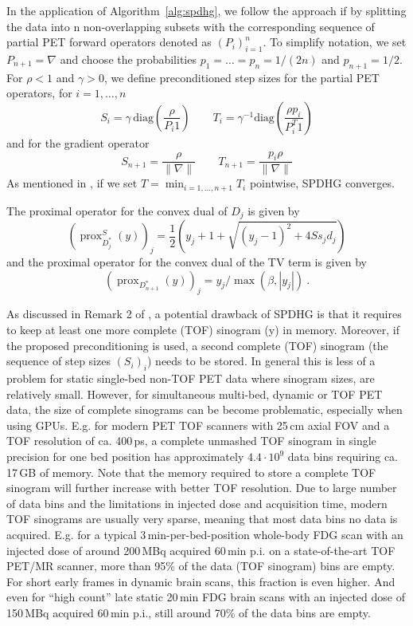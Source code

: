 \documentclass[11pt,twocolumn,twoside]{article}
\DeclareMathOperator{\prox}{prox}
\begin{document}
In the application of Algorithm~\ref{alg:spdhg}, we follow the approach if \cite{Ehrhardt2019}
by splitting the data into n non-overlapping subsets with the corresponding 
sequence of partial PET forward operators denoted as $(P_i)_{i=1}^n$.
To simplify notation, we set $P_{n+1} = \nabla$ and choose the probabilities $p_1=\ldots=p_n = 1/(2n)$
and $p_{n+1} = 1/2$.
For $\rho<1$ and $\gamma>0$, we define preconditioned step sizes for the partial PET operators, 
for $i=1,\ldots,n$
\[ S_i = \gamma \, \text{diag}(\frac{\rho}{P_i 1} )\qquad  T_i = \gamma^{-1} \text{diag}(\frac{\rho p_i}{P^T_i 1}) \]
and for the gradient operator
\[ S_{n+1} = \frac{\rho}{\|\nabla\|} \qquad T_{n+1} = \frac{p_i\rho}{\|\nabla\|} \]  
As mentioned in \cite{Ehrhardt2019}, if we set $T = \min_{i=1,\ldots,n+1} T_i$ pointwise,
SPDHG converges.

The proximal operator for the convex dual of $D_j$ is given by
\begin{equation}
(\prox_{D_j^*}^{S}(y))_j = \frac{1}{2} \left(y_j + 1 + \sqrt{ (y_j-1)^2 + 4 S s_j d_j} \right)
\label{eq:proxD}
\end{equation} 
and the proximal operator for the convex dual of the TV term is given by
\begin{equation}
(\prox_{D_{n+1}^*}(y) )_j = y_j /\max(\beta,|y_j|) \ .
\end{equation}

As discussed in Remark 2 of \cite{Ehrhardt2019}, a potential drawback of SPDHG is that it requires
to keep at least one more complete (TOF) sinogram (y) in memory. 
Moreover, if the proposed preconditioning is used, a second complete (TOF) sinogram
(the sequence of step sizes $(S_i)_i$) needs to be stored.
In general this is less of a problem for static single-bed non-TOF PET data where sinogram sizes, 
are relatively small.
However, for simultaneous multi-bed, dynamic or TOF PET data, the size of complete sinograms
can be become problematic, especially when using GPUs.
E.g. for modern PET TOF scanners with 25\,cm axial FOV and a TOF resolution of ca. 400\,ps, 
a complete unmashed TOF sinogram in single precision for one bed position 
has approximately $4.4\cdot10^9$ data bins requiring ca. 17\,GB of memory.
Note that the memory required to store a complete TOF sinogram will further 
increase with better TOF resolution.
Due to large number of data bins and the limitations in injected dose and acquisition time,
modern TOF sinograms are usually very sparse, meaning that most data bins no data is
acquired.
E.g. for a typical 3\,min-per-bed-position whole-body FDG scan with an injected dose 
of around 200\,MBq acquired 60\,min p.i. on a state-of-the-art TOF PET/MR scanner, 
more than 95\% of the data (TOF sinogram) bins are empty.
For short early frames in dynamic brain scans, this fraction is even higher.
And even for ``high count'' late static 20\,min FDG brain scans with an injected dose of 150\,MBq
acquired 60\,min p.i., still around 70\% of the data bins are empty.
\end{document}
